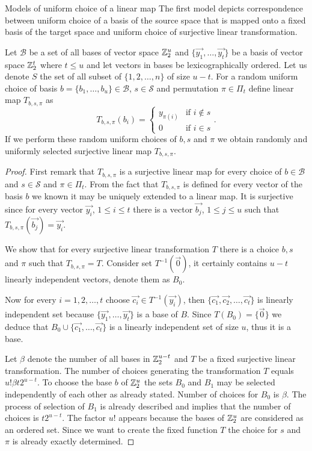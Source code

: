 \begin{section}{Models of uniform choice of a linear map}
The first model depicts correspondence between uniform choice of a basis of the source space that is mapped onto a fixed basis of the target space and uniform choice of surjective linear transformation.
\begin{remark}
\label{remark-model-surjective-linear-map-selection}
Let $\mathcal{B}$ be a set of all bases of vector space $\mathbb{Z}_{2}^{u}$ and $\{\vec{y_1}, \dots, \vec{y_t}\}$ be a basis of vector space $\mathbb{Z}_{2}^{t}$ where $t \leq u$ and let vectors in bases be lexicographically ordered. Let us denote $S$ the set of all subset of $\{1, 2, \dots, n\}$ of size $u - t$. For a random uniform choice of basis $b = \{b_1, \dots, b_u\} \in \mathcal{B}$, $s \in \mathcal{S}$ and permutation $\pi \in \Pi_t$ define linear map $T_{b, s, \pi}$ as
\[
T_{b, s, \pi}(b_i) =  
  \begin{cases} 
    y_{\pi(i)} & \text{if } i \notin s \\
    0 & \text{if } i \in s
  \end{cases} \text{.}
\]
If we perform these random uniform choices of $b, s$ and $\pi$ we obtain randomly and uniformly selected surjective linear map $T_{b, s, \pi}$.
\end{remark}
\begin{proof}
First remark that $T_{b, s, \pi}$ is a surjective linear map for every choice of $b \in \mathcal{B}$ and $s \in \mathcal{S}$ and $\pi \in \Pi_t$. From the fact that $T_{b, s, \pi}$ is defined for every vector of the basis $b$ we known it may be uniquely extended to a linear map. It is surjective since for every vector $\vec{y_i}$, $1 \leq i \leq t$ there is a vector $\vec{b_j}$, $1 \leq j \leq u$ such that $T_{b, s, \pi}(\vec{b_j}) = \vec{y_i}$. 

We show that for every surjective linear transformation $T$ there is a choice $b, s$ and $\pi$ such that $T_{b, s, \pi} = T$. Consider set $T^{-1}(\vec{0})$, it certainly contains $u - t$ linearly independent vectors, denote them as $B_0$. 

Now for every $i = 1, 2, \dots, t$ choose $\vec{c_i} \in T^{-1}(\vec{y_i})$, then $\{\vec{c_1}, \vec{c_2}, \dots, \vec{c_t}\}$ is linearly independent set because $\{\vec{y_1}, \dots, \vec{y_t}\}$ is a base of $B$. Since $T(B_0) = \{ \vec{0} \}$ we deduce that $B_0 \cup \{ \vec{c_1}, \dots, \vec{c_t} \}$ is a linearly independent set of size $u$, thus it is a base.

Let $\beta$ denote the number of all bases in $\mathbb{Z}_{2}^{u - t}$ and $T$ be a fixed surjective linear transformation. The number of choices generating the transformation $T$ equals $u! \beta t 2 ^ {u - t}$. To choose the base $b$ of $\mathbb{Z}_{2}^{u}$ the sets $B_0$ and $B_1$ may be selected independently of each other as already stated. Number of choices for $B_0$ is $\beta$. The process of selection of $B_1$ is already described and implies that the number of choices is $t 2 ^ {u - t}$. The factor $u!$ appears because the bases of $\mathbb{Z}_{2}^{u}$ are considered as an ordered set. Since we want to create the fixed function $T$ the choice for $s$ and $\pi$ is already exactly determined. 
\end{proof}


\end{section}
